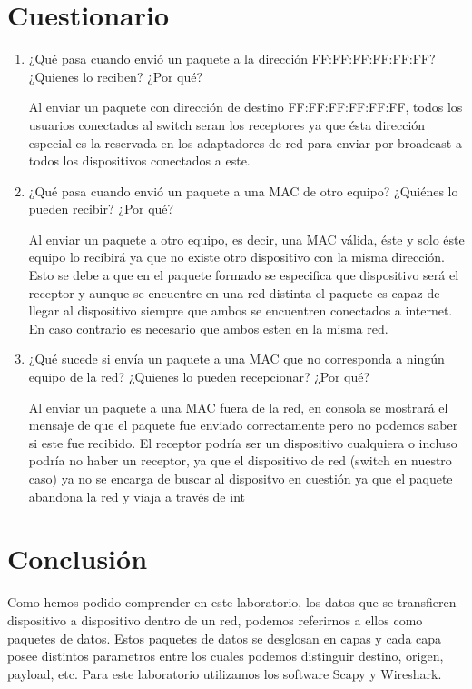 \documentclass[spanish]{udpreport}
\begin{document}
\chapter{Cuestionario}
\begin{enumerate}

\item¿Qué  pasa  cuando  envió  un  paquete  a  la  dirección  FF:FF:FF:FF:FF:FF?  ¿Quienes 
lo reciben? ¿Por qué?

Al enviar un paquete con dirección de destino FF:FF:FF:FF:FF:FF, todos los usuarios conectados al switch seran los receptores ya que ésta dirección especial es la reservada en los adaptadores de red para enviar por broadcast a todos los dispositivos conectados a este.

\item¿Qué  pasa  cuando  envió  un  paquete  a  una  MAC  de  otro  equipo?  ¿Quiénes  lo pueden recibir? ¿Por qué?

Al enviar un paquete a otro equipo, es decir, una MAC válida, éste y solo éste equipo lo recibirá ya que no existe otro dispositivo con la misma dirección. Esto se debe a que en el paquete formado se especifica que dispositivo será el receptor y aunque se encuentre en una red distinta el paquete es capaz de llegar al dispositivo siempre que ambos se encuentren conectados a internet. En caso contrario es necesario que ambos esten en la misma red.

\item¿Qué  sucede  si  envía  un  paquete  a  una  MAC  que  no  corresponda  a  ningún  equipo de la red? ¿Quienes lo pueden recepcionar? ¿Por qué?

Al enviar un paquete a una MAC fuera de la red, en consola se mostrará el mensaje de que el paquete fue enviado correctamente pero no podemos saber si este fue recibido. El receptor podría ser un dispositivo cualquiera o incluso podría no haber un receptor, ya que el dispositivo de red (switch en nuestro caso) ya no se encarga de buscar al dispositvo en cuestión ya que el paquete abandona la red y viaja a través de int



\end{enumerate}
\chapter{Conclusión}
Como hemos podido comprender en este laboratorio, los datos que se transfieren dispositivo a dispositivo dentro de un red, podemos referirnos a ellos como paquetes de datos.
Estos paquetes de datos se desglosan en capas y cada capa posee distintos parametros entre los cuales podemos distinguir destino, origen, payload, etc.
Para este laboratorio utilizamos los software Scapy y Wireshark.
\end{document}
